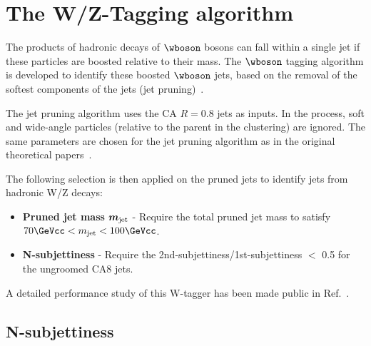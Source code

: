 \section{The W/Z-Tagging algorithm}
\label{sec: W/Z tagging}

The products of hadronic decays of $\wboson$ bosons can
fall within a single jet if these particles are boosted relative to
their mass.  The $\wboson$ tagging algorithm is developed to
identify these boosted $\wboson$ jets, based on the removal of the softest
components of the jets (jet pruning)~\cite{catop_cms,topwtag_pas}.

The jet pruning algorithm uses the CA $R=0.8$ jets
as inputs. In the process, soft and
wide-angle particles (relative to the parent in the clustering) are
ignored.  The same parameters are chosen for the jet pruning algorithm
as in the original theoretical papers~\cite{jetpruning1,jetpruning2}.

The following selection is then applied on the pruned jets
to identify jets from hadronic W/Z decays:

\begin{itemize}

\item {\bf Pruned jet mass}  $\mbox{\boldmath$m_{\text{jet}}$}$
  - Require the total pruned jet mass to satisfy $70 \GeVcc < m_\text{jet} <  100 \GeVcc $.

\item {\bf N-subjettiness} 
  - Require the 2nd-subjettiness/1st-subjettiness $<$ 0.5 for the ungroomed CA8 jets. 
\end{itemize}

A detailed performance study of this W-tagger has been made public in Ref.~\cite{JME-13-006}.

\subsection{N-subjettiness}
\label{sec:N-subjettiness}

